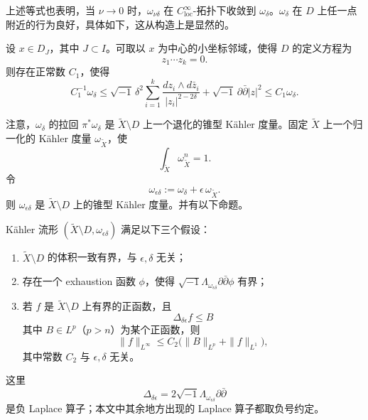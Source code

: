 上述等式也表明，当 \(\nu\to 0\) 时，\(\omega_{\nu\delta}\) 在 \(C^\infty_{\mathrm{loc}}\)-拓扑下收敛到 \(\omega_\delta\)。\(\omega_\delta\) 在 \(D\) 上任一点附近的行为良好，具体如下，这从构造上是显然的。

\begin{lemma}
设 \(x\in D_J\)，其中 \(J\subset I\)。可取以 \(x\) 为中心的小坐标邻域，使得 \(D\) 的定义方程为
\[
z_1\cdots z_k=0.
\]
则存在正常数 \(C_1\)，使得
\[
C_1^{-1}\omega_\delta
\le
\sqrt{-1}\,\delta^2\sum_{i=1}^k \frac{dz_i\wedge d\bar z_i}{|z_i|^{2-2\delta}}
+\sqrt{-1}\,\partial\bar\partial |z|^2
\le
C_1\omega_\delta.
\]
\end{lemma}

注意，\(\omega_\delta\) 的拉回 \(\pi^*\omega_\delta\) 是 \(\widetilde X\setminus D\) 上一个退化的锥型 Kähler 度量。固定 \(\widetilde X\) 上一个归一化的 Kähler 度量 \(\omega_{\widetilde X}\)，使
\[
\int_{\widetilde X}\omega_{\widetilde X}^n=1.
\]
令
\[
\omega_{\epsilon\delta}:=\omega_\delta+\epsilon\,\omega_{\widetilde X}.
\]
则 \(\omega_{\epsilon\delta}\) 是 \(\widetilde X\setminus D\) 上的锥型 Kähler 度量。并有以下命题。

\begin{proposition}
Kähler 流形 \((\widetilde X\setminus D,\omega_{\epsilon\delta})\) 满足以下三个假设：
\begin{enumerate}[label=\arabic*.]
\item \(\widetilde X\setminus D\) 的体积一致有界，与 \(\epsilon,\delta\) 无关；
\item 存在一个 exhaustion 函数 \(\phi\)，使得 \(\sqrt{-1}\Lambda_{\omega_{\epsilon\delta}}\partial\bar\partial \phi\) 有界；
\item 若 \(f\) 是 \(\widetilde X\setminus D\) 上有界的正函数，且
\[
\Delta_{\delta\epsilon}f\le B
\]
其中 \(B\in L^p\)（\(p>n\)）为某个正函数，则
\[
\|f\|_{L^\infty}\le C_2\bigl(\|B\|_{L^p}+\|f\|_{L^1}\bigr),
\]
其中常数 \(C_2\) 与 \(\epsilon,\delta\) 无关。
\end{enumerate}
这里
\[
\Delta_{\delta\epsilon}=2\sqrt{-1}\Lambda_{\omega_{\epsilon\delta}}\partial\bar\partial
\]
是负 Laplace 算子；本文中其余地方出现的 Laplace 算子都取负号约定。
\end{proposition}

